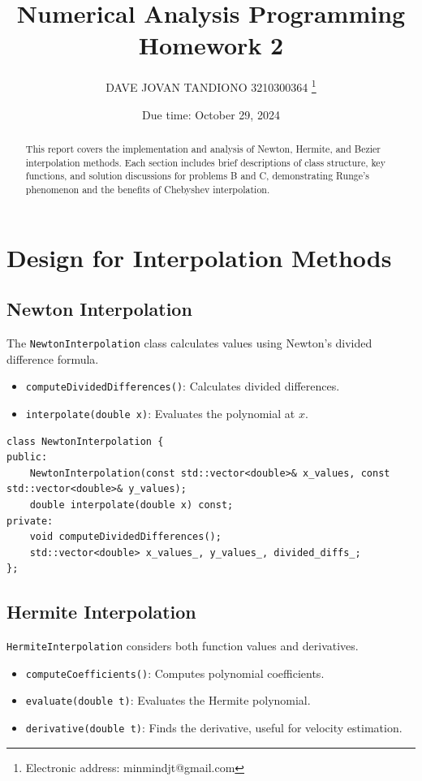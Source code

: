 \documentclass[a4paper]{article}
\begin{document}
\title{Numerical Analysis Programming Homework 2}
\author{DAVE JOVAN TANDIONO 3210300364 \thanks{Electronic address: minmindjt@gmail.com}}
\date{Due time: October 29, 2024}

\maketitle

\begin{abstract}
This report covers the implementation and analysis of Newton, Hermite, and Bezier interpolation methods. Each section includes brief descriptions of class structure, key functions, and solution discussions for problems B and C, demonstrating Runge's phenomenon and the benefits of Chebyshev interpolation.
\end{abstract}

\section*{Design for Interpolation Methods}

\subsection*{Newton Interpolation}
The \texttt{NewtonInterpolation} class calculates values using Newton’s divided difference formula.
\begin{itemize}
    \item \texttt{computeDividedDifferences()}: Calculates divided differences.
    \item \texttt{interpolate(double x)}: Evaluates the polynomial at \( x \).
\end{itemize}

\begin{lstlisting}
class NewtonInterpolation {
public:
    NewtonInterpolation(const std::vector<double>& x_values, const std::vector<double>& y_values);
    double interpolate(double x) const;
private:
    void computeDividedDifferences();
    std::vector<double> x_values_, y_values_, divided_diffs_;
};
\end{lstlisting}

\subsection*{Hermite Interpolation}
\texttt{HermiteInterpolation} considers both function values and derivatives.
\begin{itemize}
    \item \texttt{computeCoefficients()}: Computes polynomial coefficients.
    \item \texttt{evaluate(double t)}: Evaluates the Hermite polynomial.
    \item \texttt{derivative(double t)}: Finds the derivative, useful for velocity estimation.
\end{itemize}
\end{document}
